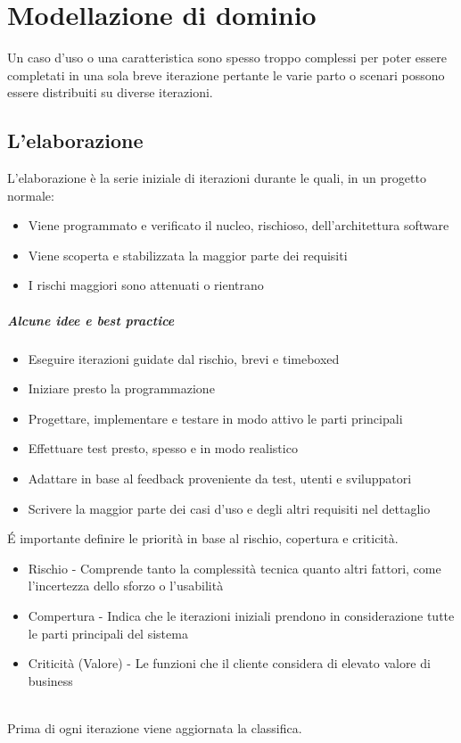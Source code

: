 \chapter{Modellazione di dominio}
Un caso d'uso o una caratteristica sono spesso troppo
complessi per poter essere completati in una sola breve iterazione
pertante le varie parto o scenari possono essere distribuiti su diverse iterazioni.

\section{L'elaborazione}
L'elaborazione è la serie iniziale di iterazioni durante le quali, in un progetto
normale:
\begin{itemize}
    \item Viene programmato e verificato il nucleo, rischioso, dell'architettura software
    \item Viene scoperta e stabilizzata la maggior parte dei requisiti
    \item I rischi maggiori sono attenuati o rientrano
\end{itemize}
\paragraph*{Alcune idee e best practice}
\begin{itemize}
    \item Eseguire iterazioni guidate dal rischio, brevi e timeboxed
    \item Iniziare presto la programmazione
    \item Progettare, implementare e testare in modo attivo le parti principali
    \item Effettuare test presto, spesso e in modo realistico
    \item Adattare in base al feedback proveniente da test, utenti e sviluppatori
    \item Scrivere la maggior parte dei casi d'uso e degli altri requisiti nel dettaglio
\end{itemize}
\'E importante definire le priorità in base al rischio, copertura e criticità.
\begin{itemize}
    \item Rischio - Comprende tanto la complessità tecnica quanto altri fattori,
    come l'incertezza dello sforzo o l'usabilità
    \item Compertura - Indica che le iterazioni iniziali prendono in considerazione tutte
    le parti principali del sistema
    \item Criticità (Valore) - Le funzioni che il cliente considera di elevato
    valore di business
\end{itemize}
\\Prima di ogni iterazione viene aggiornata la classifica.
